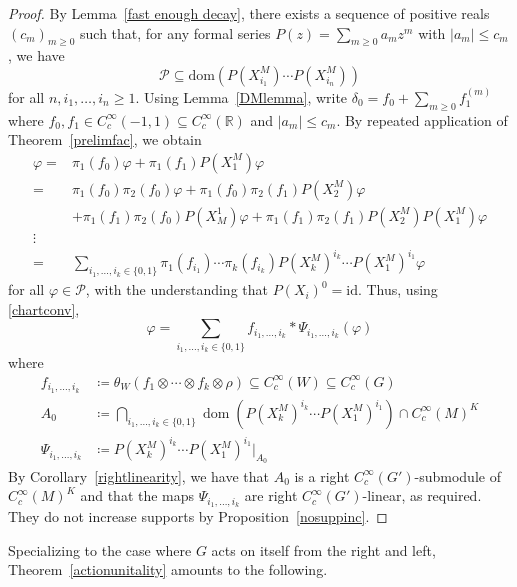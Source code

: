 \documentclass[12pt]{article}
\theoremstyle{plain}
\theoremstyle{definition}
\newcommand{\R}{\mathbb{R}}
\newcommand{\dom}{\operatorname{dom}}
\newcommand{\id}{\mathrm{id}}
\numberwithin{equation}{section}
\begin{document}
\begin{proof}
By Lemma~\ref{fast enough decay}, there exists a sequence of positive reals $(c_m)_{m \geq 0}$ such that, for any formal series $P(z) = \sum_{m \geq 0 } a_m z^m$ with $|a_m|\leq c_m$, we have
\[ \mathscr{P} \subseteq  \mathrm{dom}( P(X_{i_1}^M) \cdots P(X_{i_n}^M) ) \] 
for all $n, i_1,\ldots,i_n \geq 1$. Using Lemma~\ref{DMlemma}, write $\delta_0 = f_0 +\sum_{m \geq 0} f_1^{(m)}$ where $f_0,f_1 \in C_c^\infty(-1,1) \subseteq C_c^\infty(\R)$   and $|a_m| \leq c_m$. By repeated application of Theorem~\ref{prelimfac}, we obtain
\begin{align*}
 \varphi 
=& \pi_1(f_0) \varphi + \pi_1(f_1) P(X^M_1) \varphi \\
=& \pi_1(f_0) \pi_2(f_0) \varphi  + \pi_1(f_0) \pi_2(f_1) P(X^M_2) \varphi  \\
&+ \pi_1(f_1) \pi_2(f_0) P(X_M^1) \varphi + \pi_1(f_1)\pi_2(f_1)P(X^M_2)P(X^M_1) \varphi \\
\vdots& \\
=& \sum_{i_1, \ldots,i_k \in \{0,1\}} \pi_1(f_{i_1}) \cdots \pi_k(f_{i_k}) P(X^M_k)^{i_k} \cdots P(X^M_1)^{i_1} \varphi 
\end{align*}
for all $\varphi \in \mathscr{P}$, with the understanding that $P(X_i)^0=\id$. Thus, using \eqref{chartconv},
\[ \varphi = \sum_{i_1, \ldots,i_k \in \{0,1\}} f_{i_1,\ldots,i_k} *  \Psi_{i_1,\ldots,i_k} ( \varphi ) \]
where 
\begin{align*}
f_{i_1,\ldots,i_k} &\coloneqq \theta_W( f_1 \otimes \cdots \otimes f_k \otimes \rho) \subseteq C_c^\infty(W) \subseteq C_c^\infty(G) \\ 
A_0 &\coloneqq  \bigcap_{i_1, \ldots,i_k \in \{0,1\}} \dom\left( P(X^M_k)^{i_k} \cdots P(X^M_1)^{i_1} \right) \cap C_c^\infty(M)^K \\
\Psi_{i_1,\ldots,i_k} &\coloneqq P(X^M_k)^{i_k} \cdots P(X^M_1)^{i_1}|_{A_0}
\end{align*}
By Corollary~\ref{rightlinearity}, we have that $A_0$ is a right $C_c^\infty(G')$-submodule of  $C_c^\infty(M)^K$  and that the maps $\Psi_{i_1,\ldots,i_k}$ are right $C_c^\infty(G')$-linear, as required. They do not increase supports by Proposition~\ref{nosuppinc}.
\end{proof}


Specializing to the case where $G$ acts on itself from the right and left, Theorem~\ref{actionunitality} amounts to the following.
\end{document}
